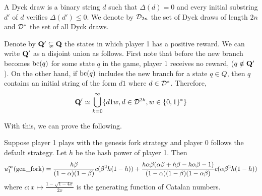 \begin{mydef}
 A Dyck draw is a binary string $d$ such that $\Delta(d)=0$ and every initial substring $d'$ of $d$ verifies $\Delta(d')\leq 0$. We denote by $\mathcal{D}_{2n}$ the set of Dyck draws of length $2n$ and $\mathcal{D}^\ast$ the set of all Dyck draws.
\end{mydef}

Denote by $\mathbf{Q}'\subsetneq \mathbf{Q}$ the states in which player 1 has a positive reward. We can write $\mathbf{Q}'$ as a disjoint union as follows. First note that before the new branch becomes $\text{bc}(q)$ for some state $q$ in the game, player 1 receives no reward, (\ie $q\notin \mathbf{Q}'$). On the other hand, if $\text{bc}(q)$ includes the new branch for a state $q\in Q$, then $q$ contains an initial string of the form $d1$ where $d\in \mathcal{D}^\ast$. Therefore,
$$\mathbf{Q}'\simeq \bigcup_{k=0}^\infty \{d1w,d\in \mathcal{D}^{2k},w\in \{0,1\}^\ast\}$$

With this, we can prove the following.



\begin{myprop*}
	Suppose player 1 plays with the genesis fork strategy and player 0 follows the default strategy. Let $h$ be the hash power of player 1. Then
	\begin{eqnarray*}
		u_1^\infty(\text{\rm gen\_fork}) =\frac{h\beta}{(1-\alpha)(1-\beta)}c(\beta^2h(1-h))+\frac{h\alpha\beta(\alpha\beta+h\beta-h\alpha\beta-1)}{(1-\alpha)(1-\beta)(1-\alpha\beta)}c(\alpha\beta^2h(1-h))
	\end{eqnarray*}
where $c:x\mapsto \frac{1-\sqrt{1-4x}}{2x}$ is the generating function of Catalan numbers.
\end{myprop*}


